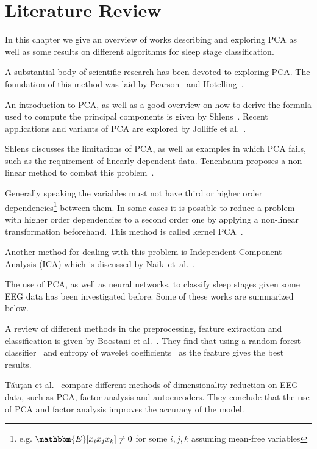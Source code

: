 \chapter{\color{change} Literature Review \color{black}}
\label{chapter:study_of_literature}

\color{change} In this chapter we give an overview of works describing and exploring PCA as well as some results on different algorithms for sleep stage classification. \color{black}

A substantial body of scientific research has been devoted to exploring PCA.
The foundation of this method was laid by Pearson~\cite{Pearson1901} and Hotelling~\cite{Hotelling1933}.

An introduction to PCA, as well as a good overview on how to derive the formula used to compute the principal components is given by Shlens~\cite{Shlens2014}.
Recent applications and variants of PCA are explored by Jolliffe et al.~\cite{Jolliffe2016}.

Shlens discusses the limitations of PCA, as well as examples in which PCA fails, such as the requirement of linearly dependent data.
Tenenbaum proposes a non-linear method to combat this problem~\cite{Tenenbaum2000}.

Generally speaking the variables must not have third or higher order dependencies\footnote{e.g. $\mathbbm{E}[x_ix_jx_k] \neq 0$ for some $i, j, k$ assuming mean-free variables} between them. In some cases it is possible to reduce a problem with higher order dependencies to a second order one by applying a non-linear transformation beforehand. This method is called kernel PCA~\cite{Scholkopf1997}.

Another method for dealing with this problem is Independent Component Analysis (ICA) which is discussed by Naik~et~al.~\cite{Naik2011}.

The use of PCA, as well as neural networks, to classify sleep stages given some EEG data has been investigated before. Some of these works are summarized below.

A review of different methods in the preprocessing, feature extraction and classification is given by Boostani et al.~\cite{Boostani2017}. They find that using a random forest classifier~\cite{Breiman2001} and entropy of wavelet coefficients~\cite{Chui1994} as the feature gives the best results.

Tăuţan et al.~\cite{Tautan2021} compare different methods of dimensionality reduction on EEG data, such as PCA, factor analysis and autoencoders. They conclude that the use of PCA and factor analysis improves the accuracy of the model.

